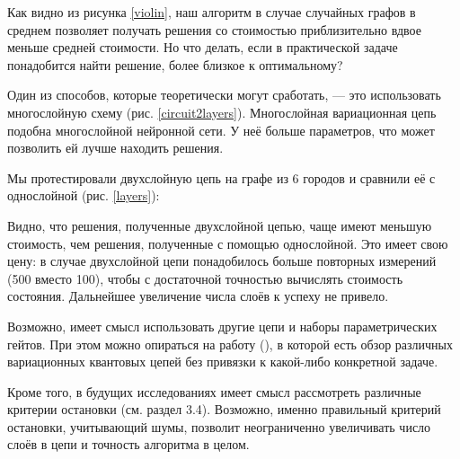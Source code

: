 

Как видно из рисунка \ref{violin}, наш алгоритм в случае случайных графов в среднем позволяет получать решения со стоимостью приблизительно вдвое меньше средней стоимости. 
Но что делать, если в практической задаче понадобится найти решение, более близкое к оптимальному?

Один из способов, которые теоретически могут сработать, --- это использовать многослойную схему (рис. \ref{circuit2layers}). Многослойная вариационная цепь подобна многослойной нейронной сети. У неё больше параметров, что может позволить ей лучше находить решения. 



Мы протестировали двухслойную цепь на графе из 6 городов и сравнили её с однослойной (рис. \ref{layers}):


Видно, что решения, полученные двухслойной цепью, чаще имеют меньшую стоимость, чем решения, полученные с помощью однослойной. Это имеет свою цену: в случае двухслойной цепи понадобилось больше повторных измерений (500 вместо 100), чтобы с достаточной точностью вычислять стоимость состояния. Дальнейшее увеличение числа слоёв к успеху не привело. 

Возможно, имеет смысл использовать другие цепи и наборы параметрических гейтов. При этом можно опираться на работу \cite{Expressibility} (\citeyear{Expressibility}), в которой есть обзор различных вариационных квантовых цепей без привязки к какой-либо конкретной задаче.

Кроме того, в будущих исследованиях имеет смысл рассмотреть различные критерии остановки (см. раздел 3.4). 
Возможно, именно правильный критерий остановки, учитывающий шумы, позволит неограниченно увеличивать число слоёв в цепи и точность алгоритма в целом.


